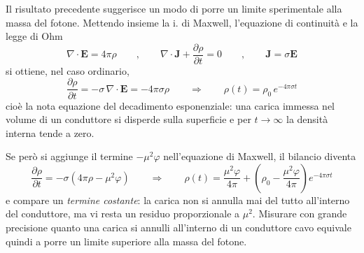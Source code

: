 Il risultato precedente suggerisce un modo di porre un limite sperimentale alla massa del fotone. Mettendo insieme la i. di Maxwell, l'equazione di continuità e la legge di Ohm
%
\begin{equation*}
    \nabla\cdot\mathbf{E} = 4\pi\rho \qquad , \qquad \nabla\cdot\mathbf{J} + \frac{\partial \rho}{\partial t} = 0 \qquad , \qquad \mathbf{J} = \sigma \mathbf{E}
\end{equation*}
si ottiene, nel caso ordinario,
%
\begin{equation}
    \frac{\partial \rho}{\partial t} = -\sigma \, \nabla\cdot\mathbf{E} = -4\pi\sigma\rho \qquad \Longrightarrow \qquad \rho(t) = \rho_0 \, e^{-4\pi\sigma t}
\end{equation}
cioè la nota equazione del decadimento esponenziale: una carica immessa nel volume di un conduttore si disperde sulla superficie e per $t \to \infty$ la densità interna tende a zero.

Se però si aggiunge il termine $-\mu^2\varphi$ nell'equazione di Maxwell, il bilancio diventa
%
\begin{equation}
    \frac{\partial \rho}{\partial t} = -\sigma\left(4\pi\rho - \mu^2\varphi\right) \qquad \Longrightarrow \qquad \rho(t) = \frac{\mu^2 \varphi}{4\pi} + \left(\rho_0 - \frac{\mu^2\varphi}{4\pi}\right)e^{-4\pi\sigma t}
\end{equation}
e compare un \emph{termine costante}: la carica non si annulla mai del tutto all'interno del conduttore, ma vi resta un residuo proporzionale a $\mu^2$. Misurare con grande precisione quanto una carica si annulli all'interno di un conduttore cavo equivale quindi a porre un limite superiore alla massa del fotone.
